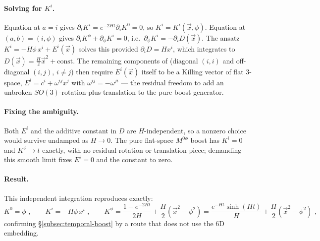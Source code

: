 \documentclass[11pt]{article}
\begin{document}
\paragraph{Solving for $K^i$.}
Equation  at $a=i$ gives $\partial_tK^i=e^{-2Ht}\partial_iK^0=0$, so
$K^i=K^i(\vec{x},\phi)$. Equation  at $(a,b)=(i,\phi)$ gives
$\partial_iK^\phi+\partial_\phi K^i=0$, i.e.\ $\partial_\phi K^i=-\partial_iD(\vec{x})$. The
ansatz $K^i=-H\phi\,x^i+E^i(\vec{x})$ solves this provided $\partial_iD=Hx^i$, which integrates
to $D(\vec{x})=\tfrac{H}{2}\vec{x}^2+\text{const.}$ The remaining components of 
(diagonal $(i,i)$ and off-diagonal $(i,j)$, $i\neq j$) then require $E^i(\vec{x})$ itself to be
a Killing vector of flat $3$-space, $E^i=c^i+\omega^{ij}x^j$ with $\omega^{ij}=-\omega^{ji}$ ---
the residual freedom to add an unbroken $SO(3)$-rotation-plus-translation to the pure boost
generator.

\paragraph{Fixing the ambiguity.}
Both $E^i$ and the additive constant in $D$ are $H$-independent, so a nonzero choice would
survive undamped as $H\to0$. The pure flat-space $M^{0\phi}$ boost has $K^i=0$ and
$K^\phi\to t$ exactly, with no residual rotation or translation piece; demanding this smooth
limit fixes $E^i=0$ and the constant to zero.

\paragraph{Result.}
This independent integration reproduces  exactly:
\begin{equation}
\label{eq:crosscheck-result}
K^0=\phi \,\,, \qquad K^i=-H\phi\,x^i \,\,, \qquad
K^\phi=\frac{1-e^{-2Ht}}{2H}+\frac{H}{2}\left(\vec{x}^2-\phi^2\right)
=\frac{e^{-Ht}\sinh(Ht)}{H}+\frac{H}{2}\left(\vec{x}^2-\phi^2\right) \,\,,
\end{equation}
confirming \S\ref{subsec:temporal-boost} by a route that does not use the $6$D embedding.
\end{document}

